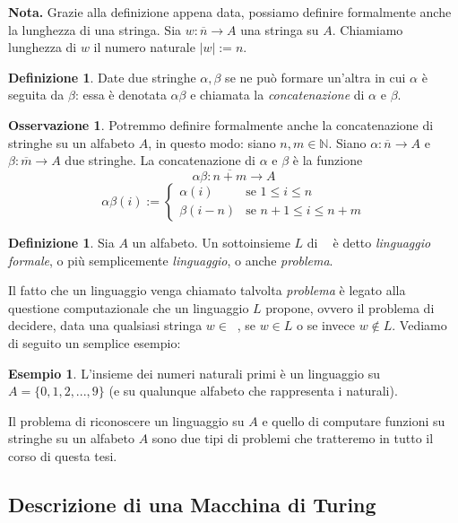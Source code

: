 \documentclass[12pt,a4paper]{report}
\theoremstyle{definition}
\newtheorem{defn}[teo]{Definizione}  %
\newtheorem{es}[teo]{Esempio}  %
\newtheorem{oss}[teo]{Osservazione}  %
\DeclareMathOperator{\aaa}{\textit{A}^{\star}}
\begin{document}
\noindent \textbf{Nota.} Grazie alla definizione appena data, possiamo definire formalmente anche la lunghezza di una stringa. Sia $w : \overline{n} \longrightarrow A$ una stringa su $A$. Chiamiamo lunghezza di $w$ il numero naturale $|w|:=n$.

\begin{defn}
Date due stringhe $\alpha, \beta$ se ne può formare un'altra in cui $\alpha$ è seguita da $\beta$: essa è denotata $\alpha \beta$ e chiamata la \emph{concatenazione} di $\alpha$ e $\beta$.
\end{defn}

\begin{oss}
Potremmo definire formalmente anche la concatenazione di stringhe su un alfabeto $A$, in questo modo: siano $n,m \in \mathbb{N}$. Siano $\alpha : \overline{n} \longrightarrow A$ e $\beta : \overline{m} \longrightarrow A$ due stringhe. La concatenazione di $\alpha$ e $\beta$ è la funzione 
$$\alpha \beta : \overline{n+m} \longrightarrow A$$ 
$$\alpha \beta (i) := 
\begin{cases} 
\alpha (i) & \mbox{se } 1 \leq i \leq n \\
\beta (i-n) & \mbox{se } n+1 \leq i \leq n+m
\end{cases}$$
\end{oss}


\begin{defn}
Sia $A$ un alfabeto. Un sottoinsieme $L$ di $\aaa$ è detto \emph{linguaggio formale}, o più semplicemente \emph{linguaggio}, o anche \emph{problema}.
\end{defn}

Il fatto che un linguaggio venga chiamato talvolta \emph{problema} è legato alla questione computazionale che un linguaggio $L$ propone, ovvero il problema di decidere, data una qualsiasi stringa $w \in \aaa$, se $w \in L$ o se invece $w \not\in L$. Vediamo di seguito un semplice esempio:
\begin{es}
L'insieme dei numeri naturali primi è un linguaggio su $A=\{0,1,2,...,9\}$ (e su qualunque alfabeto che rappresenta i naturali).
\end{es}

Il problema di riconoscere un linguaggio su $A$ e quello di computare funzioni su stringhe su un alfabeto $A$ sono due tipi di problemi che tratteremo in tutto il corso di questa tesi.


\subsection{Descrizione di una Macchina di Turing}
\end{document}

